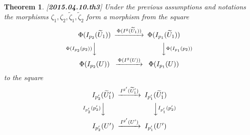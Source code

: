 \documentclass[12pt]{article}
\newtheorem{theorem}[proposition]{Theorem}
\newcommand{\llabel}[1]{\label{#1}[{\bf #1}]}
\newcommand{\wt}{\widetilde}
\begin{document}
%
\begin{theorem}
\llabel{2015.04.10.th3}
Under the previous assumptions and notations the morphisms $\zeta_1,\zeta_2,\wt{\zeta}_1,\wt{\zeta}_2$ form a morphism from the square
%
$$
\begin{CD}
\Phi(I_{p_2}(\wt{U}_1)) @>\Phi(I^g(\wt{U}_1))>> \Phi(I_{p_1}(\wt{U}_1))\\
@V\Phi(I_{p_2}(p_2)) VV @VV \Phi(I_{p_1}(p_2)) V\\
\Phi(I_{p_2}(U)) @>\Phi(I^g(U))>> \Phi(I_{p_1}(U))
\end{CD}
$$
%
to the square
%
$$
\begin{CD}
I_{p_2'}(\wt{U}_1') @>I^{g'}(\wt{U}_1')>> I_{p_1'}(\wt{U}_1')\\
@VI_{p_2'}(p_2') VV @VV I_{p_1'}(p_2') V\\
I_{p_2'}(U') @>I^{g'}(U')>> I_{p_1'}(U')
\end{CD}
$$
%
\end{theorem}
%
\end{document}

